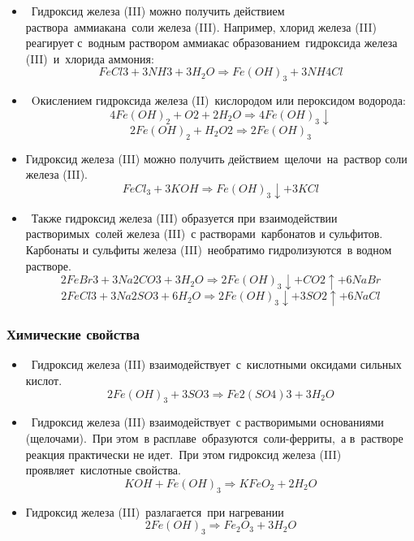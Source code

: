 \documentclass[11pt]{article}
\begin{document}
\begin{itemize}
\item Гидроксид железа (III) можно получить действием
раствора аммиакана соли железа (III).
Hапример, хлорид железа (III) реагирует с водным раствором аммиакас
образованием гидроксида железа (III) и хлорида аммония:
$$FeCl 3  + 3NH 3  + 3H _2 O \Rightarrow Fe(OH)_3  + 3NH 4 Cl$$
\item Oкислением гидроксида железа (II) кислородом или пероксидом водорода:
$$4Fe(OH)_2   +  O 2   +  2H _2 O  \Rightarrow   4Fe(OH) _3 \downarrow$$
$$2Fe(OH)_2    +  H _2 O 2     \Rightarrow  2Fe(OH) _3$$

\item Гидроксид железа (III) можно получить действием щелочи на раствор соли
железа (III).
$$FeCl _3  + 3KOH    \Rightarrow   Fe(OH) _3 \downarrow + 3KCl$$
\item  Также гидроксид железа (III) образуется при взаимодействии
растворимых солей железа (III) с растворами карбонатов и сульфитов.
Карбонаты и сульфиты железа (III) необратимо гидролизуются в водном
растворе.
$$2FeBr 3   +  3Na 2 CO 3   + 3H _2 O  \Rightarrow  2Fe(OH)_3 \downarrow   +  CO 2 \uparrow  +  6NaBr$$
$$2FeCl 3   +  3Na 2 SO 3   +  6H _2 O  \Rightarrow  2Fe(OH)_3 \downarrow  +  3SO 2 \uparrow   +  6NaCl$$
\end{itemize}

\subsubsection{Химические свойства}
\begin{itemize}
 железа (III) проявляет слабовыраженные амфотерные свойства,
с преобладанием основных. Как основание, гидроксид железа (III) реагирует
с растворимыми кислотами.
$$Fe(OH)_3  + 3HNO _3  \Rightarrow Fe(NO _3 ) _3  + 3H _2 O$$
$$Fe(OH)_3   +  3HCl \Rightarrow  FeCl _3   +  3H _2 O$$
$$2Fe(OH)_3   +  3H _2 SO _4   \Rightarrow Fe _2 (SO _4 ) _3   +  6H _2 O$$
$$Fe(OH)_3   +  3HBr \Rightarrow  FeBr _3   +  3H _2 O$$
\item  Гидроксид железа (III) взаимодействует с кислотными оксидами сильных
кислот.
$$2Fe(OH)_3  + 3SO 3  \Rightarrow Fe 2 (SO 4 ) 3  + 3H _2 O$$
\item Гидроксид железа (III) взаимодействует с растворимыми основаниями
(щелочами). При этом в расплаве образуются соли-ферриты, а в растворе
реакция практически не идет. При этом гидроксид железа (III)
проявляет кислотные свойства.
$$KOH  +  Fe(OH)_3   \Rightarrow KFeO _2  + 2H _2 O$$
\item Гидроксид железа (III) разлагается при нагревании
$$2Fe(OH)_3  \Rightarrow Fe _2 O _3  + 3H _2 O$$
\end{itemize}
\end{document}
